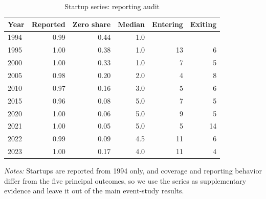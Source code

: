 \begin{table}[htbp]\centering
\caption{Startup series: reporting audit}\label{tab:startups}
\begin{threeparttable}\footnotesize
\begin{tabular}{lrrrrr}\toprule
Year & Reported & Zero share & Median & Entering & Exiting \\\midrule
1994 & 0.99 & 0.44 & 1.0 &  &  \\
1995 & 1.00 & 0.38 & 1.0 & 13 & 6 \\
2000 & 1.00 & 0.33 & 1.0 & 7 & 5 \\
2005 & 0.98 & 0.20 & 2.0 & 4 & 8 \\
2010 & 0.97 & 0.16 & 3.0 & 5 & 6 \\
2015 & 0.96 & 0.08 & 5.0 & 7 & 5 \\
2020 & 1.00 & 0.06 & 5.0 & 9 & 5 \\
2021 & 1.00 & 0.05 & 5.0 & 5 & 14 \\
2022 & 0.99 & 0.09 & 4.5 & 11 & 6 \\
2023 & 1.00 & 0.17 & 4.0 & 11 & 4 \\
\bottomrule
\end{tabular}
\begin{tablenotes}[flushleft]\footnotesize
\item \textit{Notes:} Startups are reported from 1994 only, and coverage and reporting behavior differ from the five principal outcomes, so we use the series as supplementary evidence and leave it out of the main event-study results.
\end{tablenotes}
\end{threeparttable}
\end{table}
